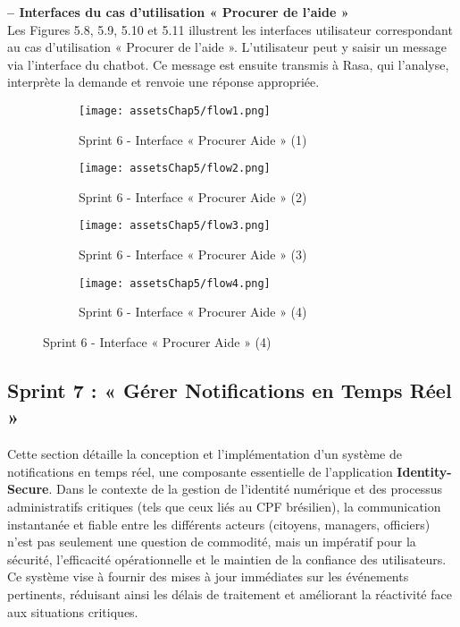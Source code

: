 \textbf{– Interfaces du cas d’utilisation « Procurer de l’aide »}\\
Les Figures 5.8, 5.9, 5.10 et 5.11 illustrent les interfaces utilisateur correspondant au cas d’utilisation « Procurer de l’aide ». L’utilisateur peut y saisir un message via l’interface du chatbot. Ce message est ensuite transmis à Rasa, qui l’analyse, interprète la demande et renvoie une réponse appropriée.




\begin{figure}[H]
    \centering
    \begin{subfigure}{0.45\textwidth}
        \centering
        \texttt{[image: assetsChap5/flow1.png]}
        \caption{Sprint 6 - Interface « Procurer Aide » (1)}
    \end{subfigure}
    \hfill
    \begin{subfigure}{0.45\textwidth}
        \centering
        \texttt{[image: assetsChap5/flow2.png]}
        \caption{Sprint 6 - Interface « Procurer Aide » (2)}
    \end{subfigure}

    \vspace{0.5cm} %

    \begin{subfigure}{0.45\textwidth }
        \centering
        \texttt{[image: assetsChap5/flow3.png]}
        \caption{Sprint 6 - Interface « Procurer Aide » (3)}
    \end{subfigure}
    \hfill
    \begin{subfigure}{0.45\textwidth }
        \centering
        \texttt{[image: assetsChap5/flow4.png]}
        \caption{Sprint 6 - Interface « Procurer Aide » (4)}
    \end{subfigure}
\end{figure}




\subsection{Sprint 7 : « Gérer Notifications en Temps Réel »}
\label{sec:sprint7_Gérer Notifications}
Cette section détaille la conception et l'implémentation d'un système de notifications en temps réel, une composante essentielle de l'application \textbf{Identity-Secure}. Dans le contexte de la gestion de l'identité numérique et des processus administratifs critiques (tels que ceux liés au CPF brésilien), la communication instantanée et fiable entre les différents acteurs (citoyens, managers, officiers) n'est pas seulement une question de commodité, mais un impératif pour la sécurité, l'efficacité opérationnelle et le maintien de la confiance des utilisateurs. Ce système vise à fournir des mises à jour immédiates sur les événements pertinents, réduisant ainsi les délais de traitement et améliorant la réactivité face aux situations critiques.

